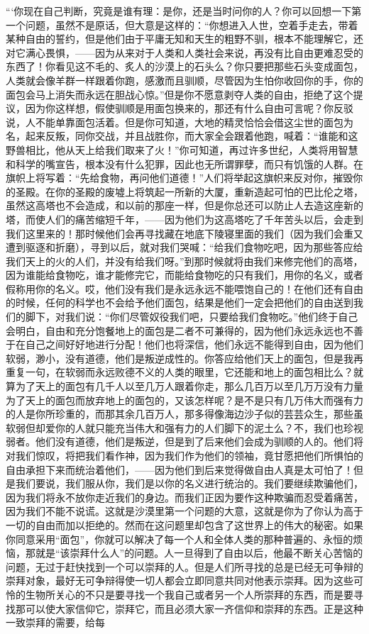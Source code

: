 \par “‘你现在自己判断，究竟是谁有理：是你，还是当时问你的人？你可以回想一下第一个问题，虽然不是原话，但大意是这样的：“你想进入人世，空着手走去，带着某种自由的誓约，但是他们由于平庸无知和天生的粗野不驯，根本不能理解它，还对它满心畏惧，——因为从来对于人类和人类社会来说，再没有比自由更难忍受的东西了！你看见这不毛的、炙人的沙漠上的石头么？你只要把那些石头变成面包，人类就会像羊群一样跟着你跑，感激而且驯顺，尽管因为生怕你收回你的手，你的面包会马上消失而永远在胆战心惊。”但是你不愿意剥夺人类的自由，拒绝了这个提议，因为你这样想，假使驯顺是用面包换来的，那还有什么自由可言呢？你反驳说，人不能单靠面包活着。但是你可知道，大地的精灵恰恰会借这尘世的面包为名，起来反叛，同你交战，并且战胜你，而大家全会跟着他跑，喊着：“谁能和这野兽相比，他从天上给我们取来了火！”你可知道，再过许多世纪，人类将用智慧和科学的嘴宣告，根本没有什么犯罪，因此也无所谓罪孽，而只有饥饿的人群。在旗帜上将写着：“先给食物，再问他们道德！”人们将举起这旗帜来反对你，摧毁你的圣殿。在你的圣殿的废墟上将筑起一所新的大厦，重新造起可怕的巴比伦之塔，虽然这高塔也不会造成，和以前的那座一样，但是你总还可以防止人去造这座新的塔，而使人们的痛苦缩短千年，——因为他们为这高塔吃了千年苦头以后，会走到我们这里来的！那时候他们会再寻找藏在地底下陵寝里面的我们（因为我们会重又遭到驱逐和折磨），寻到以后，就对我们哭喊：“给我们食物吃吧，因为那些答应给我们天上的火的人们，并没有给我们呀。”到那时候就将由我们来修完他们的高塔，因为谁能给食物吃，谁才能修完它，而能给食物吃的只有我们，用你的名义，或者假称用你的名义。哎，他们没有我们是永远永远不能喂饱自己的！在他们还有自由的时候，任何的科学也不会给予他们面包，结果是他们一定会把他们的自由送到我们的脚下，对我们说：“你们尽管奴役我们吧，只要给我们食物吃。”他们终于自己会明白，自由和充分饱餐地上的面包是二者不可兼得的，因为他们永远永远也不善于在自己之间好好地进行分配！他们也将深信，他们永远不能得到自由，因为他们软弱，渺小，没有道德，他们是叛逆成性的。你答应给他们天上的面包，但是我再重复一句，在软弱而永远败德不义的人类的眼里，它还能和地上的面包相比么？就算为了天上的面包有几千人以至几万人跟着你走，那么几百万以至几万万没有力量为了天上的面包而放弃地上的面包的，又该怎样呢？是不是只有几万伟大而强有力的人是你所珍重的，而那其余几百万人，那多得像海边沙子似的芸芸众生，那些虽软弱但却爱你的人就只能充当伟大和强有力的人们脚下的泥土么？不，我们也珍视弱者。他们没有道德，他们是叛逆，但是到了后来他们会成为驯顺的人的。他们将对我们惊叹，将把我们看作神，因为我们作为他们的领袖，竟甘愿把他们所惧怕的自由承担下来而统治着他们，——因为他们到后来觉得做自由人真是太可怕了！但是我们要说，我们服从你，我们是以你的名义进行统治的。我们要继续欺骗他们，因为我们将永不放你走近我们的身边。而我们正因为要作这种欺骗而忍受着痛苦，因为我们不能不说谎。这就是沙漠里第一个问题的大意，这就是你为了你认为高于一切的自由而加以拒绝的。然而在这问题里却包含了这世界上的伟大的秘密。如果你同意采用“面包”，你就可以解决了每一个人和全体人类的那种普遍的、永恒的烦恼，那就是“该崇拜什么人”的问题。人一旦得到了自由以后，他最不断关心苦恼的问题，无过于赶快找到一个可以崇拜的人。但是人们所寻找的总是已经无可争辩的崇拜对象，最好无可争辩得使一切人都会立即同意共同对他表示崇拜。因为这些可怜的生物所关心的不只是要寻找一个我自己或者另一个人所崇拜的东西，而是要寻找那可以使大家信仰它，崇拜它，而且必须大家一齐信仰和崇拜的东西。正是这种一致崇拜的需要，给每